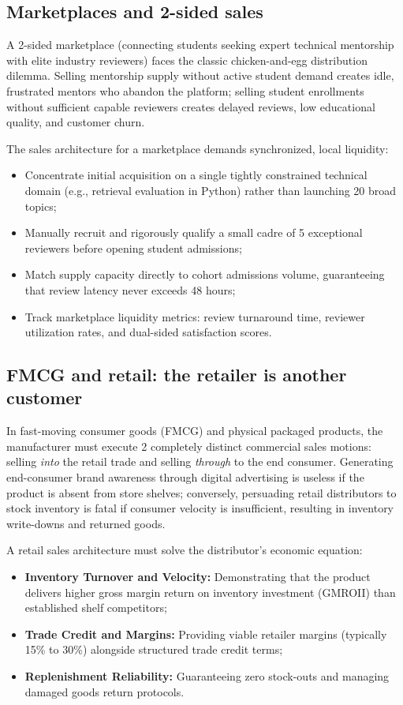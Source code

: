 \subsection{Marketplaces and 2-sided sales}

A 2-sided marketplace (connecting students seeking expert technical mentorship with elite industry reviewers) faces the classic chicken-and-egg distribution dilemma. Selling mentorship supply without active student demand creates idle, frustrated mentors who abandon the platform; selling student enrollments without sufficient capable reviewers creates delayed reviews, low educational quality, and customer churn.

The sales architecture for a marketplace demands synchronized, local liquidity:
\begin{itemize}
\item Concentrate initial acquisition on a single tightly constrained technical domain (e.g., retrieval evaluation in Python) rather than launching 20 broad topics;
\item Manually recruit and rigorously qualify a small cadre of 5 exceptional reviewers before opening student admissions;
\item Match supply capacity directly to cohort admissions volume, guaranteeing that review latency never exceeds 48 hours;
\item Track marketplace liquidity metrics: review turnaround time, reviewer utilization rates, and dual-sided satisfaction scores.
\end{itemize}

\subsection{FMCG and retail: the retailer is another customer}

In fast-moving consumer goods (FMCG) and physical packaged products, the manufacturer must execute 2 completely distinct commercial sales motions: selling \textit{into} the retail trade and selling \textit{through} to the end consumer. Generating end-consumer brand awareness through digital advertising is useless if the product is absent from store shelves; conversely, persuading retail distributors to stock inventory is fatal if consumer velocity is insufficient, resulting in inventory write-downs and returned goods.

A retail sales architecture must solve the distributor's economic equation:
\begin{itemize}
\item \textbf{Inventory Turnover and Velocity:} Demonstrating that the product delivers higher gross margin return on inventory investment (GMROII) than established shelf competitors;
\item \textbf{Trade Credit and Margins:} Providing viable retailer margins (typically 15\% to 30\%) alongside structured trade credit terms;
\item \textbf{Replenishment Reliability:} Guaranteeing zero stock-outs and managing damaged goods return protocols.
\end{itemize}

